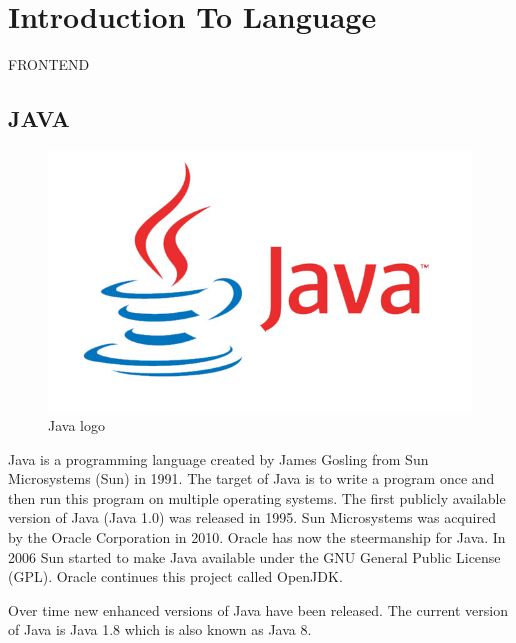 \section{Introduction To Language}
FRONTEND
\subsection{JAVA}
\begin{figure}[ht]
\begin{center}
\includegraphics[scale=0.5]{images/java.jpeg}
\end{center}
\caption{Java logo}
\label{Java logo}
\end{figure}
Java is a programming language created by James Gosling from Sun Microsystems (Sun) in 1991. The target of Java is to write a program once and then run this program on multiple operating systems. The first publicly available version of Java (Java 1.0) was released in 1995. Sun Microsystems was acquired by the Oracle Corporation in 2010. Oracle has now the steermanship for Java. In 2006 Sun started to make Java available under the GNU General Public License (GPL). Oracle continues this project called OpenJDK.

Over time new enhanced versions of Java have been released. The current version of Java is Java 1.8 which is also known as Java 8.

